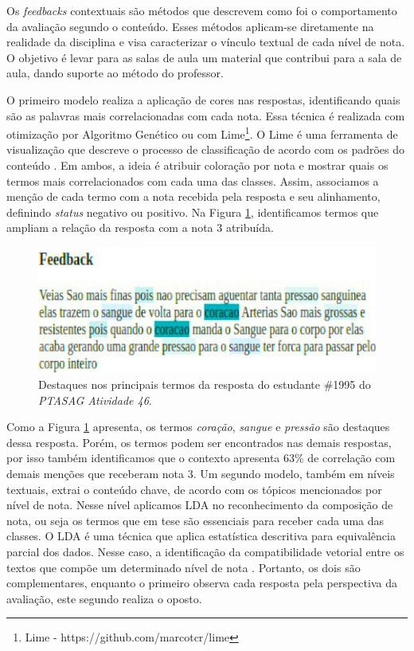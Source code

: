Os \textit{feedbacks} contextuais são métodos que descrevem como foi o comportamento da avaliação segundo o conteúdo. Esses métodos aplicam-se diretamente na realidade da disciplina e visa caracterizar o vínculo textual de cada nível de nota. O objetivo é levar para as salas de aula um material que contribui para a sala de aula, dando suporte ao método do professor.

O primeiro modelo realiza a aplicação de cores nas respostas, identificando quais são as palavras mais correlacionadas com cada nota. Essa técnica é realizada com otimização por Algoritmo Genético \cite{spalenza2016a} ou com Lime\footnote{Lime - https://github.com/marcotcr/lime}. O Lime é uma ferramenta de visualização que descreve o processo de classificação de acordo com os padrões do conteúdo \cite{ribeiro2016}. Em ambos, a ideia é atribuir coloração por nota e mostrar quais os termos mais correlacionados com cada uma das classes. Assim, associamos a menção de cada termo com a nota recebida pela resposta e seu alinhamento, definindo \textit{status} negativo ou positivo. Na Figura \ref{fig-highlight-46}, identificamos termos que ampliam a relação da resposta com a nota 3 atribuída.

\begin{figure}[!h]
 \centering
 \includegraphics[width=.75\textwidth]{figuras/exemplo/highlight.jpeg}
 \caption{Destaques nos principais termos da resposta do estudante \#1995 do \textit{PTASAG Atividade 46}.}
 \label{fig-highlight-46}
\end{figure}

Como a Figura \ref{fig-highlight-46} apresenta, os termos \textit{coração}, \textit{sangue} e \textit{pressão} são destaques dessa resposta. Porém, os termos podem ser encontrados nas demais respostas, por isso também identificamos que o contexto apresenta 63\% de correlação com demais menções que receberam nota 3. Um segundo modelo, também em níveis textuais, extrai o conteúdo chave, de acordo com os tópicos mencionados por nível de nota. Nesse nível aplicamos LDA \cite{hoffman2013} no reconhecimento da composição de nota, ou seja os termos que em tese são essenciais para receber cada uma das classes. O LDA é uma técnica que aplica estatística descritiva para equivalência parcial dos dados. Nesse caso, a identificação da compatibilidade vetorial entre os textos que compõe um determinado nível de nota \cite{sahu2020}. Portanto, os dois são complementares, enquanto o primeiro observa cada resposta pela perspectiva da avaliação, este segundo realiza o oposto. 

